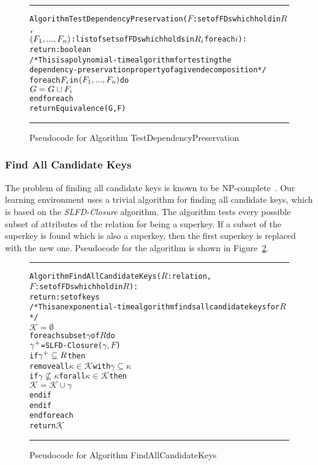 \begin{figure}[htbp]
\hrule
\vspace{0.25cm}
\begin{alltt}
Algorithm TestDependencyPreservation(\(F\): set of FDs which hold in \(R\),
           \((F\sb{1},...,F\sb{n})\): list of sets of FDs which holds in \(R\sb{i}\) for each \(i\)):
          return: boolean
/* This is a polynomial-time algorithm for testing the 
dependency-preservation property of a given decomposition */
  for each \(F\sb{i}\) in \((F\sb{1},...,F\sb{n})\) do
    \(G = G \cup F\sb{i}\)
  end foreach
  return Equivalence(G,F)
\end{alltt}
\caption{Pseudocode for Algorithm TestDependencyPreservation}\label{fig:dptest}
\hrule
\end{figure}

\subsubsection{Find All Candidate Keys}
The problem of finding all candidate keys is known to be NP-complete~\cite{p3}. 
Our learning environment uses a trivial algorithm for finding all candidate keys,
which is based on the \textit{SLFD-Closure} algorithm. The algorithm tests every possible
subset of attributes of the relation for being a superkey. If a subset of the superkey
is found which is also a superkey, then the first superkey is replaced with the new one.  
Pseudocode for the algorithm is shown in Figure~\ref{alg:findkeys}. 

\begin{figure}[htbp]
\hrule
\vspace{0.25cm}
\begin{alltt}
Algorithm FindAllCandidateKeys(\(R\): relation,
              \(F\): set of FDs which hold in \(R\)):
            return: set of keys
/* This an exponential-time algorithm finds all candidate keys for \(R\)*/             
  \(\mathcal{K} = \emptyset\)
  foreach subset \(\gamma\) of \(R\) do
    \(\gamma\sp{+}\) = SLFD-Closure(\(\gamma, F\))
    if \(\gamma\sp{+} \subseteq R\) then
      remove all \(\kappa \in \mathcal{K}\) with  \(\gamma \subseteq \kappa\)
      if \(\gamma \nsubseteq \kappa\) for all \(\kappa \in \mathcal{K}\) then
        \(\mathcal{K} = \mathcal{K} \cup \gamma\)
      end if
    end if
  end foreach
  return \(\mathcal{K}\)
\end{alltt}
\caption{Pseudocode for Algorithm FindAllCandidateKeys}\label{alg:findkeys}
\hrule
\end{figure}


